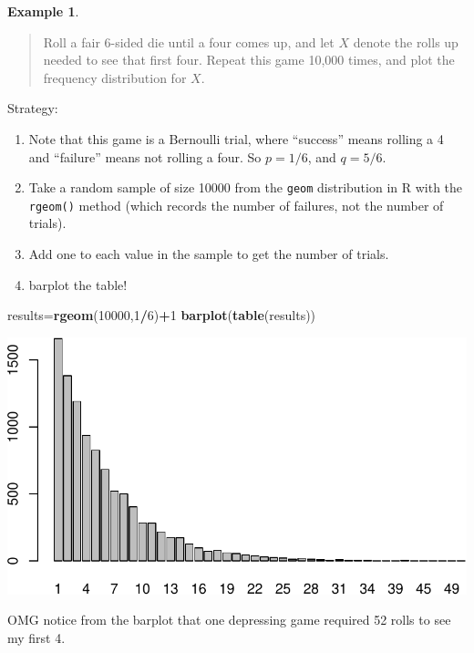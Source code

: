\documentclass[
]{book}
\newenvironment{Shaded}{\begin{snugshade}}{\end{snugshade}}
\newcommand{\DecValTok}[1]{\textcolor[rgb]{0.00,0.00,0.81}{#1}}
\newcommand{\FunctionTok}[1]{\textcolor[rgb]{0.13,0.29,0.53}{\textbf{#1}}}
\newcommand{\NormalTok}[1]{#1}
\newcommand{\OtherTok}[1]{\textcolor[rgb]{0.56,0.35,0.01}{#1}}
\newcommand{\SpecialCharTok}[1]{\textcolor[rgb]{0.81,0.36,0.00}{\textbf{#1}}}
\providecommand{\tightlist}{%
  \setlength{\itemsep}{0pt}\setlength{\parskip}{0pt}}
\theoremstyle{definition}
\theoremstyle{definition}
\newtheorem{example}{Example}[chapter]
\theoremstyle{definition}
\theoremstyle{definition}
\theoremstyle{remark}
\begin{document}
\begin{example}
\protect\hypertarget{exm:roll-until-4-R}{}\label{exm:roll-until-4-R}\leavevmode

\begin{quote}
Roll a fair 6-sided die until a four comes up, and let \(X\) denote the rolls up needed to see that first four. Repeat this game 10,000 times, and plot the frequency distribution for \(X\).
\end{quote}

Strategy:

\begin{enumerate}
\def\labelenumi{\arabic{enumi}.}
\tightlist
\item
  Note that this game is a Bernoulli trial, where ``success'' means rolling a 4 and ``failure'' means not rolling a four. So \(p = 1/6\), and \(q = 5/6\).\\
\item
  Take a random sample of size 10000 from the \texttt{geom} distribution in R with the \texttt{rgeom()} method (which records the number of failures, not the number of trials).
\item
  Add one to each value in the sample to get the number of trials.
\item
  barplot the table!
\end{enumerate}

\begin{Shaded}
\begin{Highlighting}[]
\NormalTok{results}\OtherTok{=}\FunctionTok{rgeom}\NormalTok{(}\DecValTok{10000}\NormalTok{,}\DecValTok{1}\SpecialCharTok{/}\DecValTok{6}\NormalTok{)}\SpecialCharTok{+}\DecValTok{1}
\FunctionTok{barplot}\NormalTok{(}\FunctionTok{table}\NormalTok{(results))}
\end{Highlighting}
\end{Shaded}

\includegraphics{math340-notes_files/figure-latex/unnamed-chunk-155-1.pdf}

OMG notice from the barplot that one depressing game required 52 rolls to see my first 4.

\end{example}
\end{document}
